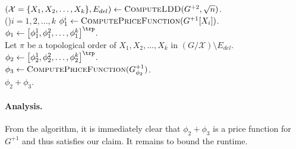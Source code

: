 \begin{algorithm}
$(\mathcal{X} = \{X_1, X_2, \ldots, X_k\}, E_{del}) \gets \textsc{ComputeLDD}(G^{+2}, \sqrt{n})$.\\

\lFor(\label{lne:priceFunInvocClusters}){$i = 1, 2, \ldots, k$}{
	$\phi_1^i \gets \textsc{ComputePriceFunction}(G^{+1}[X_i])$.
}
$\phi_1 \gets \left[ \phi_1^1 , \phi_1^2 , \ldots,  \phi_1^k \right]^{\trp}$.\\

Let $\pi$ be a topological order of $X_1, X_2, \ldots, X_k$ in $(G/ \mathcal{X}) \setminus E_{del}$.\\
$\phi_2 \gets \left[ \phi_2^1 , \phi_2^2 , \ldots,  \phi_2^k \right]^{\trp}$.\\

$\phi_3 \gets  \textsc{ComputePriceFunction}(G^{+1}_{\phi_2})$.\label{lne:computePriceOnNegBackEdges}\\
\Return $\phi_2 + \phi_3$.
\caption{$\textsc{PriceFunctionOnNormalizedGraph}(G = (V, E,\ww))$}
\label{alg:negSSSPEasy}
\end{algorithm}

\paragraph{Analysis.} From the algorithm, it is immediately clear that $\phi_2 + \phi_3$ is a price function for $G^{+1}$ and thus satisfies our claim. It remains to bound the runtime.

